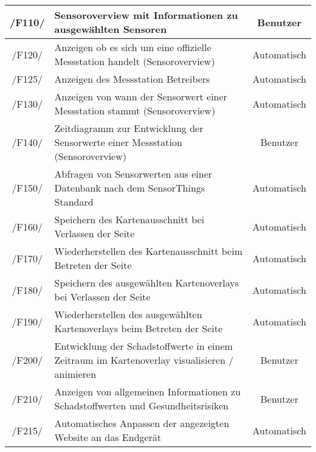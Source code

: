 \begin{tabularx}{\textwidth}{| c | X | c |}
        \hline        
        /F110/ & \gls{Sensoroverview} mit Informationen zu ausgewählten Sensoren & Benutzer \\
        \hline
        /F120/ & Anzeigen ob es sich um eine offizielle Messstation handelt (\gls{Sensoroverview}) & Automatisch \\
        \hline
        /F125/ & Anzeigen des Messstation Betreibers & Automatisch \\
        \hline
        /F130/ & Anzeigen von wann der Sensorwert einer Messstation stammt (\gls{Sensoroverview}) & Automatisch \\
        \hline
        /F140/ & Zeitdiagramm zur Entwicklung der Sensorwerte einer Messstation (\gls{Sensoroverview}) & Benutzer \\
        \hline
        /F150/ & Abfragen von Sensorwerten aus einer Datenbank nach dem SensorThings Standard & Automatisch \\
        \hline
        /F160/ & Speichern des Kartenausschnitt bei Verlassen der Seite & Automatisch \\
        \hline
        /F170/ & Wiederherstellen des Kartenausschnitt beim Betreten der Seite & Automatisch \\
        \hline
        /F180/ & Speichern des ausgewählten \glspl{Kartenoverlay} bei Verlassen der Seite & Automatisch \\
        \hline
        /F190/ & Wiederherstellen des ausgewählten \glspl{Kartenoverlay} beim Betreten der Seite & Automatisch \\
        \hline
        /F200/ & Entwicklung der Schadstoffwerte in einem Zeitraum im \gls{Kartenoverlay} visualisieren / animieren & Benutzer \\
        \hline
        /F210/ & Anzeigen von allgemeinen Informationen zu Schadstoffwerten und Gesundheitsrisiken & Benutzer \\
        \hline
        /F215/ & Automatisches Anpassen der angezeigten Website an das Endgerät & Automatisch \\
        \hline
\end{tabularx}
